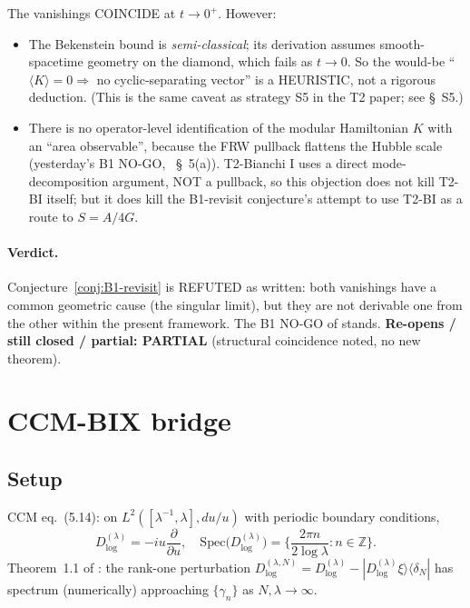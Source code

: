 \documentclass[11pt,a4paper]{article}
\theoremstyle{definition}
\begin{document}
The vanishings COINCIDE at $t \to 0^+$. However:
\begin{itemize}
  \item The Bekenstein bound is \emph{semi-classical}; its derivation
  assumes smooth-spacetime geometry on the diamond, which fails as
  $t\to 0$. So the would-be ``$\langle K\rangle = 0
  \Rightarrow$ no cyclic-separating vector'' is a HEURISTIC, not a
  rigorous deduction. (This is the same caveat as strategy S5 in the
  T2 paper; see \cite{T2BIextension2026} \S~S5.)
  \item There is no operator-level identification of the modular
  Hamiltonian $K$ with an ``area observable'', because the FRW
  pullback flattens the Hubble scale (yesterday's B1 NO-GO,
  \cite{B1FRWentropy2026}~\S~5(a)). T2-Bianchi I uses a direct
  mode-decomposition argument, NOT a pullback, so this objection does
  not kill T2-BI itself; but it does kill the B1-revisit conjecture's
  attempt to use T2-BI as a route to $S = A/4G$.
\end{itemize}

\paragraph{Verdict.} Conjecture~\ref{conj:B1-revisit} is REFUTED as
written: both vanishings have a common geometric cause (the singular
limit), but they are not derivable one from the other within the
present framework. The B1 NO-GO of \cite{B1FRWentropy2026} stands.
\textbf{Re-opens / still closed / partial: PARTIAL} (structural
coincidence noted, no new theorem).

\section{CCM-BIX bridge}

\subsection{Setup}

CCM \cite{CCM2025} eq.~(5.14): on $L^2([\lambda^{-1}, \lambda],
du/u)$ with periodic boundary conditions,
\begin{equation}
  D^{(\lambda)}_{\log} = -i u \frac{\partial}{\partial u},
  \quad
  \mathrm{Spec}\bigl(D^{(\lambda)}_{\log}\bigr) = \biggl\{\frac{2\pi n}{2 \log \lambda} :
   n \in \mathbb Z\biggr\}.
\end{equation}
Theorem~1.1 of \cite{CCM2025}: the rank-one perturbation
$D^{(\lambda, N)}_{\log} = D^{(\lambda)}_{\log} -
|D^{(\lambda)}_{\log} \xi\rangle\langle \delta_N|$
has spectrum (numerically) approaching $\{\gamma_n\}$ as
$N, \lambda \to \infty$.
\end{document}
